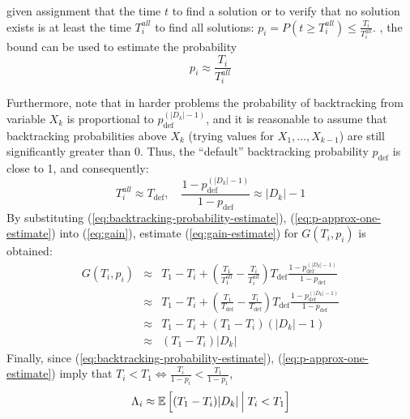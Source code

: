 given assignment that the time $t$ to find a solution or to verify that
no solution exists is at least the time $T_i^{all}$ to find all
solutions: $p_i=P\left(t\ge T_i^{all}\right)\le \frac{T_i} {T_i^{all}}$.
, the bound can be used to
estimate the  probability
\begin{equation}
\label{eq:backtracking-probability-estimate}
p_i\approx\frac{T_i} {T_i^{all}}
\end{equation}

Furthermore, note that in harder problems  the probability of
backtracking from variable $X_k$ is proportional to $p_\mathrm{def}^{(|D_k|-1)}$, and it is
reasonable to assume that backtracking probabilities above $X_k$
(trying values for $X_1, ..., X_{k-1}$)  are still significantly greater than 0.
Thus, the ``default'' backtracking
probability $p_\mathrm{def}$ is close to 1, and consequently:
\begin{equation}
  \label{eq:p-approx-one-estimate}
T_i^{all} \approx T_\mathrm{def},\quad\frac{1-p_\mathrm{def}^{(|D_k|-1)}}{1-p_\mathrm{def}} \approx |D_k|-1
\end{equation}
By substituting (\ref{eq:backtracking-probability-estimate}),
(\ref{eq:p-approx-one-estimate}) into (\ref{eq:gain}),
estimate (\ref{eq:gain-estimate}) for $G(T_i, p_i)$ is obtained:
\begin{eqnarray}
\label{eq:gain-estimate}
G(T_i, p_i)&\approx&T_1-T_i+(\frac {T_1} {T_1^{all}}-\frac {T_i} {T_i^{all}})T_\mathrm{def}\frac{1-p_\mathrm{def}^{(|D_k|-1)}}{1-p_\mathrm{def}}\nonumber\\
           &\approx&T_1-T_i+(\frac {T_1} {T_\mathrm{def}}-\frac {T_i} {T_\mathrm{def}})T_\mathrm{def}\frac{1-p_\mathrm{def}^{(|D_k|-1)}}{1-p_\mathrm{def}}\nonumber\\
           &\approx&T_1-T_i+(T_1-T_i)(|D_k|-1)\nonumber\\
           &\approx&(T_1-T_i)|D_k|
\end{eqnarray}
Finally, since (\ref{eq:backtracking-probability-estimate}), (\ref{eq:p-approx-one-estimate}) imply that $T_i<T_1 \Leftrightarrow \frac {T_i} {1-p_i} < \frac {T_1} {1-p_1}$, 
\begin{eqnarray}
\label{eq:benefit-superestimate}
\Lambda_i\approx\mathbb{E}\left[(T_1-T_i)|D_k|\,\Big|\; T_i<T_1 \right]
\end{eqnarray}

